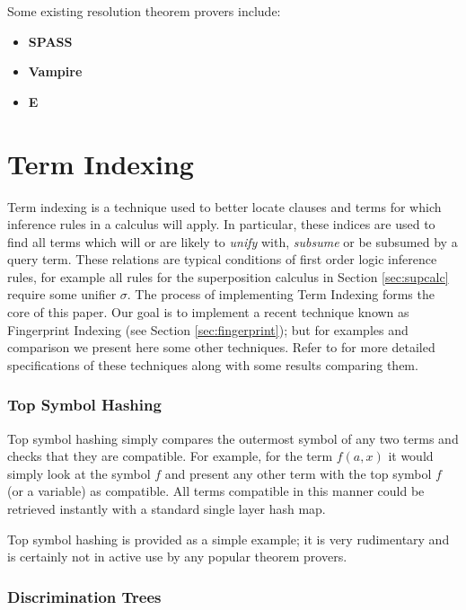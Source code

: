 Some existing resolution theorem provers include:

\begin{itemize}
\item \textbf{SPASS}
\cite{spass}
\item \textbf{Vampire}
\cite{vampire}
\item \textbf{E}
\cite{eprover}

\end{itemize}

\section{Term Indexing}
\label{sec:indexing}

Term indexing is a technique used to better locate clauses and terms for which inference rules
in a calculus will apply. In particular, these indices are used to find all terms which
will or are likely to \emph{unify} with, \emph{subsume} or be subsumed by a query term. These relations are typical conditions
of first order logic inference rules, for example all rules for the superposition calculus
in Section \ref{sec:supcalc} require some unifier $\sigma$.
The process of implementing Term Indexing forms the core of this paper. Our goal
is to implement a recent technique known as Fingerprint Indexing (see Section \ref{sec:fingerprint});
but for examples and comparison we present here some other techniques.
Refer to \cite{indexing} for more detailed specifications of these techniques along
with some results comparing them.

\subsubsection{Top Symbol Hashing}
Top symbol hashing simply compares the outermost symbol of any two terms and checks
that they are compatible. For example, for the term $f(a,x)$ it would simply look
at the symbol $f$ and present any other term with the top symbol $f$ (or a variable) as compatible.
All terms compatible in this manner could be retrieved instantly with a standard
single layer hash map.

Top symbol hashing is provided as a simple example; it is very rudimentary and
is certainly not in active use by any popular theorem provers.

\subsubsection{Discrimination Trees}

